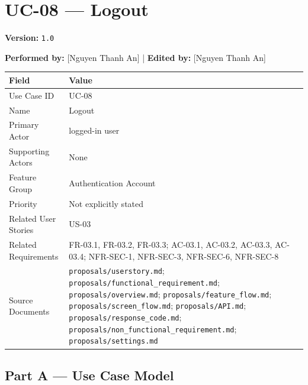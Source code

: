 \documentclass[12pt]{article}
\renewcommand{\baselinestretch}{1.5}
\begin{document}
\pagebreak
\hypertarget{sec:uc-08-logout}{}
\section*{UC-08 --- Logout}
\par\medskip

\textbf{Version:} \texttt{1.0}
\par\medskip

\textbf{Performed by:} [Nguyen Thanh An] | \textbf{Edited by:} [Nguyen Thanh An]
\par\medskip

\begingroup
\small
\renewcommand{\baselinestretch}{1.0}\selectfont
\renewcommand{\arraystretch}{1.15}
\setlength{\tabcolsep}{6pt}
\begin{longtable}{|>{\raggedright\arraybackslash}p{}|>{\raggedright\arraybackslash}p{}|}
\hline
\textbf{Field} & \textbf{Value} \\ \hline
\endhead
Use Case ID & UC-08 \\ \hline
Name & Logout \\ \hline
Primary Actor & logged-in user \\ \hline
Supporting Actors & None \\ \hline
Feature Group & Authentication Account \\ \hline
Priority & Not explicitly stated \\ \hline
Related User Stories & US-03 \\ \hline
Related Requirements & FR-03.1, FR-03.2, FR-03.3; AC-03.1, AC-03.2, AC-03.3, AC-03.4; NFR-SEC-1, NFR-SEC-3, NFR-SEC-6, NFR-SEC-8 \\ \hline
Source Documents & \texttt{proposals/userstory.md}; \texttt{proposals/functional\_requirement.md}; \texttt{proposals/overview.md}; \texttt{proposals/feature\_flow.md}; \texttt{proposals/screen\_flow.md}; \texttt{proposals/API.md}; \texttt{proposals/response\_code.md}; \texttt{proposals/non\_functional\_requirement.md}; \texttt{proposals/settings.md} \\ \hline
\end{longtable}
\endgroup
\par\medskip

\hypertarget{sec:part-a-use-case-model}{}
\subsection*{Part A --- Use Case Model}
\par\medskip
\end{document}
